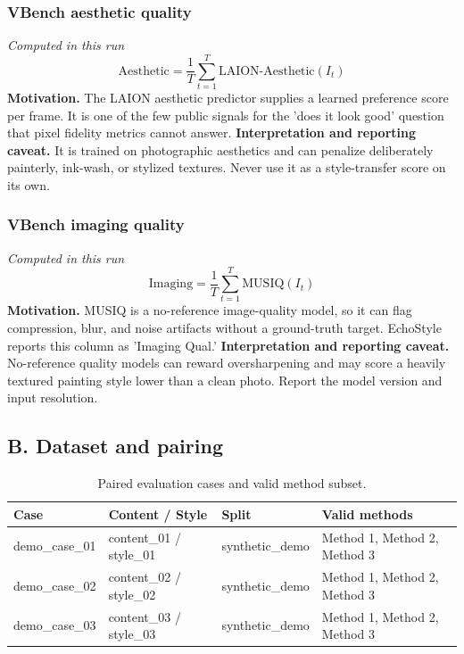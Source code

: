\documentclass[10pt]{article}
\begin{document}
\subsubsection*{VBench aesthetic quality}
\textit{Computed in this run}
\begin{equation*}
\mathrm{Aesthetic}=\frac{1}{T}\sum_{t=1}^{T}\mathrm{LAION\text{-}Aesthetic}(I_t)
\end{equation*}
\textbf{Motivation.} The LAION aesthetic predictor supplies a learned preference score per frame. It is one of the few public signals for the 'does it look good' question that pixel fidelity metrics cannot answer.
\textbf{Interpretation and reporting caveat.} It is trained on photographic aesthetics and can penalize deliberately painterly, ink-wash, or stylized textures. Never use it as a style-transfer score on its own.
\subsubsection*{VBench imaging quality}
\textit{Computed in this run}
\begin{equation*}
\mathrm{Imaging}=\frac{1}{T}\sum_{t=1}^{T}\mathrm{MUSIQ}(I_t)
\end{equation*}
\textbf{Motivation.} MUSIQ is a no-reference image-quality model, so it can flag compression, blur, and noise artifacts without a ground-truth target. EchoStyle reports this column as 'Imaging Qual.'
\textbf{Interpretation and reporting caveat.} No-reference quality models can reward oversharpening and may score a heavily textured painting style lower than a clean photo. Report the model version and input resolution.
\subsection*{B. Dataset and pairing}
\begin{table}[H]
\centering
\caption{Paired evaluation cases and valid method subset.}
\label{tab:dataset}
\small
\begin{tabularx}{\linewidth}{@{}lXlX@{}}
\toprule
Case & Content / Style & Split & Valid methods \\
\midrule
demo\_case\_01 & content\_01 / style\_01 & synthetic\_demo & Method 1, Method 2, Method 3 \\
demo\_case\_02 & content\_02 / style\_02 & synthetic\_demo & Method 1, Method 2, Method 3 \\
demo\_case\_03 & content\_03 / style\_03 & synthetic\_demo & Method 1, Method 2, Method 3 \\
\bottomrule
\end{tabularx}
\end{table}
\end{document}
